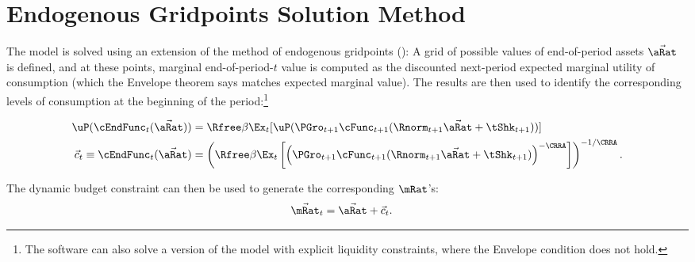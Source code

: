 \documentclass[\econtexRoot/BufferStockTheory]{subfiles}
\begin{document}
\section{Endogenous Gridpoints Solution Method}

The model is solved using an extension of the method of endogenous gridpoints (\cite{carrollEGM}): A grid of possible values of end-of-period assets $\vec{\aRat}$ is defined, and at these points, marginal end-of-period-$t$ value is computed as the discounted next-period expected marginal utility of consumption (which the Envelope theorem says matches expected marginal value).  The results are then used to identify the corresponding levels of consumption at the beginning of the period:\footnote{The software can also solve a version of the model with explicit liquidity constraints, where the Envelope condition does not hold.}

\begin{equation}\begin{gathered}\begin{aligned}
  \uP(\cEndFunc_{t}(\vec{\aRat}))  & = \Rfree \beta \Ex_{t}[ \uP(\PGro_{t+1}
  \cFunc_{t+1}(\Rnorm_{t+1}\vec{\aRat} + \tShk_{t+1}))] \label{eq:cEulerEndog}
\\ \vec{c}_{t} \equiv \cEndFunc_{t}(\vec{\aRat})  & = \left(\Rfree \beta \Ex_{t}\left[ \left(\PGro_{t+1}
      \cFunc_{t+1}(\Rnorm_{t+1}\vec{\aRat} +
      \tShk_{t+1})\right)^{-\CRRA}\right]\right)^{-1/\CRRA}. \notag
\end{aligned}\end{gathered}\end{equation}

The dynamic budget constraint can then be used to generate the corresponding $\mRat$'s:
\begin{eqnarray*}
  \vec{\mRat}_{t}  & = \vec{\aRat}+\vec{c}_{t}.
\end{eqnarray*}
\end{document}
